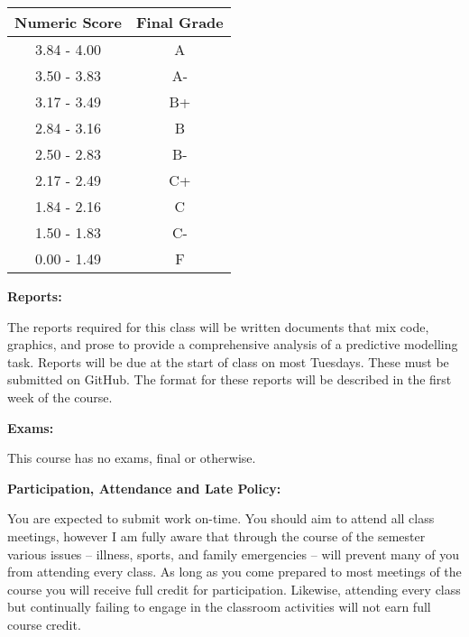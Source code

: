 \documentclass[12pt]{article}
\begin{document}
\begin{center}
\begin{tabular}{c || c}
Numeric Score & Final Grade \\
\hline \hline
3.84 - 4.00 & A  \\
3.50 - 3.83 & A- \\
3.17 - 3.49 & B+ \\
2.84 - 3.16 & B  \\
2.50 - 2.83 & B- \\
2.17 - 2.49 & C+ \\
1.84 - 2.16 & C  \\
1.50 - 1.83 & C- \\
0.00 - 1.49 & F
\end{tabular}
\end{center}

\vspace{0.4cm}

\textbf{Reports:} \vspace{6pt}

The reports required for this class will be written documents that
mix code, graphics, and prose to provide a comprehensive analysis of
a predictive modelling task. Reports will be due at the start of class
on most Tuesdays. These must be submitted on GitHub. The format for
these reports will be described in the first week of the course.

\vspace{0.4cm}

\textbf{Exams:} \vspace{6pt}

This course has no exams, final or otherwise.

\vspace{0.4cm}

\textbf{Participation, Attendance and Late Policy:} \vspace{6pt}

You are expected to submit work on-time.
You should aim to attend all class meetings, however I am fully aware that through
the course of the semester various issues -- illness, sports, and family emergencies --
will prevent many of you from attending every class. As long as you come
prepared to most meetings of the course you will receive full credit for participation.
Likewise, attending every class but continually failing to engage in
the classroom activities will not earn full course credit.


\end{document}
